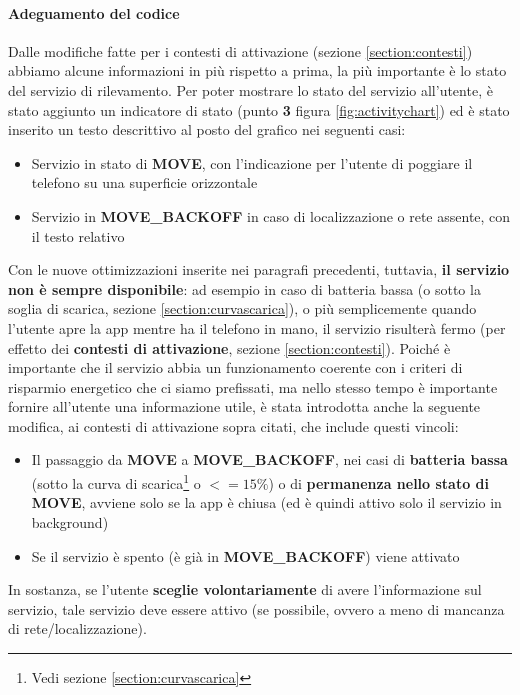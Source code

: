 \documentclass[a4paper,10pt]{memoir}
\begin{document}
\paragraph{Adeguamento del codice} Dalle modifiche fatte per i contesti di attivazione (sezione \ref{section:contesti}) abbiamo alcune informazioni in più rispetto a prima, la più importante è lo stato del servizio di rilevamento. Per poter mostrare lo stato del servizio all'utente, è stato aggiunto un indicatore di stato (punto \textbf{3} figura \ref{fig:activitychart}) ed è stato inserito un testo descrittivo al posto del grafico nei seguenti casi:

\begin{itemize}
\item Servizio in stato di \textbf{MOVE}, con l'indicazione per l'utente di poggiare il telefono su una superficie orizzontale
\item Servizio in \textbf{MOVE\_BACKOFF} in caso di localizzazione o rete assente, con il testo relativo
\end{itemize}

Con le nuove ottimizzazioni inserite nei paragrafi precedenti, tuttavia, \textbf{il servizio non è sempre disponibile}: ad esempio in caso di batteria bassa (o sotto la soglia di scarica, sezione \ref{section:curvascarica}), o più semplicemente quando l'utente apre la app mentre ha il telefono in mano, il servizio risulterà fermo (per effetto dei \textbf{contesti di attivazione}, sezione \ref{section:contesti}). Poiché è importante che il servizio abbia un funzionamento coerente con i criteri di risparmio energetico che ci siamo prefissati, ma nello stesso tempo è importante fornire all'utente una informazione utile, è stata introdotta anche la seguente modifica, ai contesti di attivazione sopra citati, che include questi vincoli:

\begin{itemize}
\item Il passaggio da \textbf{MOVE} a \textbf{MOVE\_BACKOFF}, nei casi di \textbf{batteria bassa} (sotto la curva di scarica\footnote{Vedi sezione \ref{section:curvascarica}} o $<= 15\%$) o di \textbf{permanenza nello stato di MOVE}, avviene solo se la app è chiusa (ed è quindi attivo solo il servizio in background)
\item Se il servizio è spento (è già in \textbf{MOVE\_BACKOFF}) viene attivato
\end{itemize}

In sostanza, se l'utente \textbf{sceglie volontariamente} di avere l'informazione sul servizio, tale servizio deve essere attivo (se possibile, ovvero a meno di mancanza di rete/localizzazione).
\end{document}
